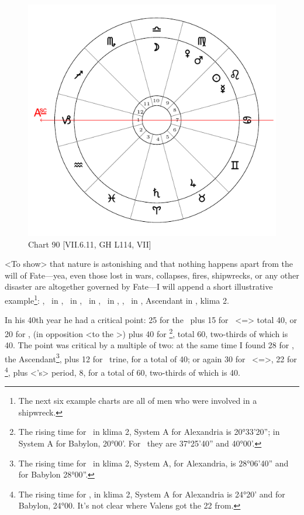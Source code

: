 \begin{figure}
\centering
\vspace{-2em}
\includegraphics[width=.68\textwidth]{charts/7_6_11}
\caption{Chart 90 [VII.6.11, GH L114, VII] }
\label{fig:chart90}
\end{figure} 

<To show> that nature is astonishing and that nothing happens apart from the will of Fate—yea, even those lost in wars, collapses, fires, shipwrecks, or any other disaster are altogether governed by Fate—I will append a short illustrative example\footnote{The next six example charts are all of men who were involved in a shipwreck.}: \Sun, \Mercury\, in \Leo, \Moon\, in \Libra, \Saturn\, in \Aries, \Jupiter\, in \Taurus, \Mars, \Venus\, in \Virgo, Ascendant in \Capricorn, klima 2. 

In his 40th year he had a critical point: 25 for the \Moon\, plus 15 for \Aries\, <=\Mars> total 40, or 20 for \Aries, (in opposition <to the \Moon>) plus 40 for \Libra\footnote{The rising time for \Aries\, in klima 2, System A for Alexandria is 20°33'20''; in System A for Babylon, 20°00'. For \Libra\, they are 37°25'40'' and 40°00'.}, total 60, two-thirds of which is 40. The point was critical by a multiple of two: at the same time I found 28 for \Capricorn, the Ascendant\footnote{The rising time for \Capricorn\, in klima 2, System A, for Alexandria, is 28°06'40'' and for Babylon 28°00''.}, plus 12 for \Jupiter\, trine, for a total of 40; or again 30 for \Capricorn\, <=\Saturn>, 22 for \Taurus\footnote{The rising time for \Taurus, in klima 2, System A for Alexandria is 24°20' and for Babylon, 24°00. It's not clear where Valens got the 22 from.}, plus <\Venus’s> period, 8, for a total of 60, two-thirds of which is 40.

